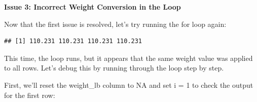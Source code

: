 \documentclass[
]{book}
\newenvironment{Shaded}{\begin{snugshade}}{\end{snugshade}}
\newcommand{\CommentTok}[1]{\textcolor[rgb]{0.56,0.35,0.01}{\textit{#1}}}
\newcommand{\ConstantTok}[1]{\textcolor[rgb]{0.56,0.35,0.01}{#1}}
\newcommand{\ControlFlowTok}[1]{\textcolor[rgb]{0.13,0.29,0.53}{\textbf{#1}}}
\newcommand{\DecValTok}[1]{\textcolor[rgb]{0.00,0.00,0.81}{#1}}
\newcommand{\FloatTok}[1]{\textcolor[rgb]{0.00,0.00,0.81}{#1}}
\newcommand{\FunctionTok}[1]{\textcolor[rgb]{0.13,0.29,0.53}{\textbf{#1}}}
\newcommand{\NormalTok}[1]{#1}
\newcommand{\OtherTok}[1]{\textcolor[rgb]{0.56,0.35,0.01}{#1}}
\newcommand{\SpecialCharTok}[1]{\textcolor[rgb]{0.81,0.36,0.00}{\textbf{#1}}}
\newcommand{\StringTok}[1]{\textcolor[rgb]{0.31,0.60,0.02}{#1}}
\begin{document}
\begin{Shaded}
\end{Shaded}

\textbf{Issue 3: Incorrect Weight Conversion in the Loop}

Now that the first issue is resolved, let's try running the for loop again:

\begin{Shaded}
\end{Shaded}

\begin{Shaded}
\end{Shaded}

\begin{verbatim}
## [1] 110.231 110.231 110.231 110.231
\end{verbatim}

This time, the loop runs, but it appears that the same weight value was applied to all rows. Let's debug this by running through the loop step by step.

First, we'll reset the weight\_lb column to NA and set i = 1 to check the output for the first row:

\begin{Shaded}
\end{Shaded}
\end{document}
